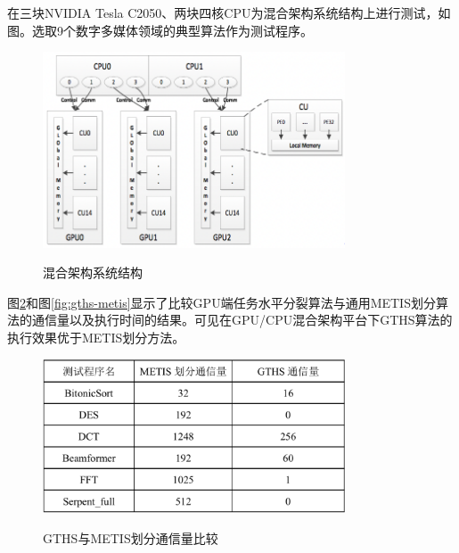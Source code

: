 在三块NVIDIA Tesla C2050、两块四核CPU为混合架构系统结构上进行测试，如图。选取9个数字多媒体领域的典型算法作为测试程序。

\begin{figure}[htbp]
  \centering
  \includegraphics[width=0.8\textwidth]{Img/Chap_Application/Yu/fusion.png}\\
  \caption{混合架构系统结构}\label{fig:fusion}
\end{figure}

图\ref{fig:gm-commu}和图\ref{fig:gths-metis}显示了比较GPU端任务水平分裂算法与通用METIS划分算法的通信量以及执行时间的结果。可见在GPU/CPU混合架构平台下GTHS算法的执行效果优于METIS划分方法。

\begin{figure}[htbp]
  \centering
  \includegraphics[width=0.8\textwidth]{Img/Chap_Application/Yu/gths-metis-commu.png}\\
  \caption{GTHS与METIS划分通信量比较}\label{fig:gm-commu}
\end{figure}

